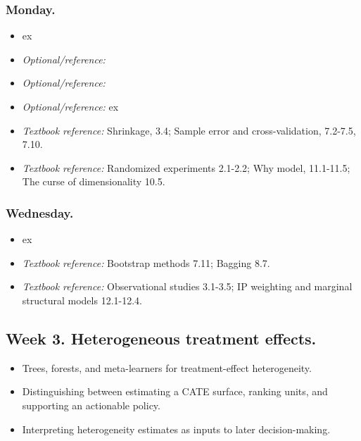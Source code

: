 \documentclass[letterpaper, 12pt, parskip=full,DIV=10]{scrartcl}
\begin{document}
\subsubsection*{Monday.}
\begin{itemize}
\item {} ex
\item \textit{Optional/reference:} 
\item \textit{Optional/reference:} 
\item \textit{Optional/reference:} 
 ex
\item \textit{Textbook reference:}  Shrinkage, 3.4; Sample error and cross-validation, 7.2-7.5, 7.10. 
\item \textit{Textbook reference:}  Randomized experiments 2.1-2.2; Why model, 11.1-11.5; The curse of dimensionality 10.5. 
\end{itemize}

\subsubsection*{Wednesday.}
\begin{itemize}
\item {} ex
\item \textit{Textbook reference:}  Bootstrap methods 7.11; Bagging 8.7.
\item \textit{Textbook reference:}  Observational studies 3.1-3.5; IP weighting and marginal structural models 12.1-12.4.
\end{itemize}

\subsection*{Week 3. Heterogeneous treatment effects.}
\begin{itemize}
\item Trees, forests, and meta-learners for treatment-effect heterogeneity.
\item Distinguishing between estimating a CATE surface, ranking units, and supporting an actionable policy.
\item Interpreting heterogeneity estimates as inputs to later decision-making.
\end{itemize}
\end{document}
